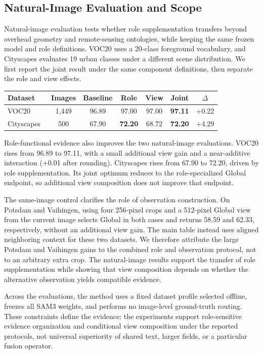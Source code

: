 \subsection{Natural-Image Evaluation and Scope}

Natural-image evaluation tests whether role supplementation transfers beyond overhead geometry and remote-sensing ontologies, while keeping the same frozen model and role definitions. VOC20 uses a 20-class foreground vocabulary, and Cityscapes evaluates 19 urban classes under a different scene distribution. We first report the joint result under the same component definitions, then separate the role and view effects.

\begin{center}
\centering
\captionsetup{hypcap=false}
\label{tab:natural}
\captionsetup{hypcap=true}
\small
\setlength{\tabcolsep}{3pt}
\begin{tabular}{lcccccc}
\toprule
Dataset & Images & Baseline & Role & View & Joint & $\Delta$ \\
\midrule
VOC20~\cite{R44} & 1,449 & 96.89 & 97.00 & 97.00 & \textbf{97.11} & +0.22 \\
Cityscapes~\cite{R43} & 500 & 67.90 & \textbf{72.20} & 68.72 & \textbf{72.20} & +4.29 \\
\bottomrule
\end{tabular}
\end{center}

Role-functional evidence also improves the two natural-image evaluations. VOC20 rises from 96.89 to 97.11, with a small additional view gain and a near-additive interaction (+0.01 after rounding). Cityscapes rises from 67.90 to 72.20, driven by role supplementation. Its joint optimum reduces to the role-specialized Global endpoint, so additional view composition does not improve that endpoint.

The same-image control clarifies the role of observation construction. On Potsdam and Vaihingen, using four 256-pixel crops and a 512-pixel Global view from the current image selects Global in both cases and returns 58.59 and 62.33, respectively, without an additional view gain. The main table instead uses aligned neighboring context for these two datasets. We therefore attribute the large Potsdam and Vaihingen gains to the combined role and observation protocol, not to an arbitrary extra crop. The natural-image results support the transfer of role supplementation while showing that view composition depends on whether the alternative observation yields compatible evidence.

Across the evaluations, the method uses a fixed dataset profile selected offline, freezes all SAM3 weights, and performs no image-level ground-truth routing. These constraints define the evidence: the experiments support role-sensitive evidence organization and conditional view composition under the reported protocols, not universal superiority of shared text, larger fields, or a particular fusion operator.




